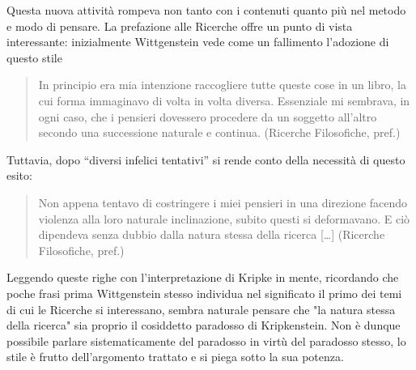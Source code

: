 \documentclass[10pt,a4paper]{article}
\begin{document}
Questa nuova attività rompeva non tanto con i contenuti quanto più nel metodo e modo di pensare. La prefazione alle Ricerche offre un punto di vista interessante: inizialmente Wittgenstein vede come un fallimento l’adozione di questo stile
\begin{quote}
	In principio era mia intenzione raccogliere tutte queste cose in un libro, la cui forma immaginavo di volta in volta diversa. Essenziale mi sembrava, in ogni caso, che i pensieri dovessero procedere da un soggetto all’altro secondo una successione naturale e continua. (Ricerche Filosofiche, pref.)
\end{quote}
Tuttavia, dopo “diversi infelici tentativi” si rende conto della necessità di questo esito:
\begin{quote}
	Non appena tentavo di costringere i miei pensieri in una direzione facendo violenza alla loro naturale inclinazione, subito questi si deformavano. E ciò dipendeva senza dubbio dalla natura stessa della ricerca […] (Ricerche Filosofiche, pref.)
\end{quote}
Leggendo queste righe con l’interpretazione di Kripke in mente, ricordando che poche frasi prima Wittgenstein stesso individua nel significato il primo dei temi di cui le Ricerche si interessano, sembra naturale pensare che "la natura stessa della ricerca" sia proprio il cosiddetto paradosso di Kripkenstein. Non è dunque possibile parlare sistematicamente del paradosso in virtù del paradosso stesso, lo stile è frutto dell’argomento trattato e si piega sotto la sua potenza.
\end{document}
